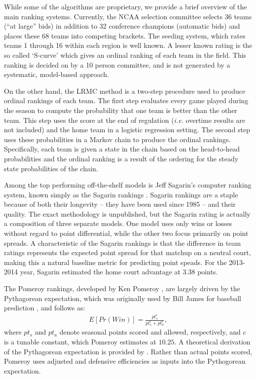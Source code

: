 \documentclass[letterpaper,12pt]{article}
\begin{document}
While some of the algorithms are proprietary, we provide a brief overview of the main ranking systems. Currently, the NCAA selection committee selects 36 teams (``at large'' bids) in addition to 32 conference champions (automatic bids) and places these 68 teams into competing brackets. The seeding system, which rates teams 1 through 16 within each region is well known. A lesser known rating is the so called `S-curve' which gives an ordinal ranking of each team in the field. This ranking is decided on by a 10 person committee, and is not generated by a systematic, model-based approach. 

On the other hand, the LRMC method \citep{Kvam2006, mark2010} is a two-step procedure used to produce ordinal rankings of each team. The first step evaluates every game played during the season to compute the probability that one team is better than the other team. This step uses the score at the end of regulation (\emph{i.e.} overtime results are not included) and the home team in a logistic regression setting. The second step uses these probabilities in a Markov chain to produce the ordinal rankings. Specifically, each team is given a state in the chain based on the head-to-head probabilities and the ordinal ranking is a result of the ordering for the steady state probabilities of the chain.

Among the top performing off-the-shelf models is Jeff Sagarin's computer ranking system, known simply as the Sagarin rankings \citep{sagarin}. Sagarin rankings are a staple because of both their longevity -- they have been used since 1985 -- and their quality. The exact methodology is unpublished, but the Sagarin rating is actually a composition of three separate models. One model uses only wins or losses without regard to point differential, while the other two focus primarily on point spreads. A characteristic of the Sagarin rankings is that the difference in team ratings represents the expected point spread for that matchup on a neutral court, making this a natural baseline metric for predicting point speads. For the 2013-2014 year, Sagarin estimated the home court advantage at 3.38 points.

The Pomeroy rankings, developed by Ken Pomeroy \citep{kenpom.com}, are largely driven by the Pythagorean expectation, which was originally used by Bill James for baseball prediction \citep{james}, and follows as:
\begin{eqnarray}
E[Pr(Win)] = \frac{pt_s^c}{pt_s^c + pt_a^c},
\end{eqnarray}
where $pt_s$ and $pt_a$ denote seasonal points scored and allowed, respectively, and $c$ is a tunable constant, which Pomeroy estimates at $10.25$.  
A theoretical derivation of the Pythagorean expectation is provided by \cite{miller2007}.
Rather than actual points scored, Pomeroy uses adjusted and defensive efficiencies as inputs into the Pythogorean expectation.
\end{document}
